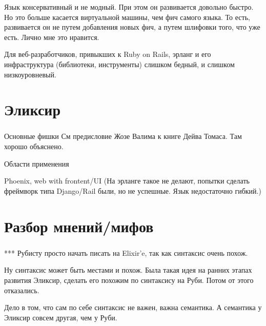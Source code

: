 \documentclass[10pt]{beamer}
\begin{document}
Язык консервативный и не модный. При этом он развивается довольно быстро. Но это больше касается виртуальной машины,
чем фич самого языка. То есть, развивается он не путем добавления новых фич, а путем шлифовки того, что уже есть.
Лично мне это нравится.

Для веб-разработчиков, привыкших к Ruby on Rails, эрланг и его инфраструктура (библиотеки, инструменты)
слишком бедный, и слишком низкоуровневый.


\section{Эликсир}

\begin{frame}
\frametitle{}
\centering
\par \bigskip
\end{frame}

\begin{frame}
\frametitle{}
\centering
\par \bigskip
\end{frame}

Основные фишки
См предисловие Жозе Валима к книге Дейва Томаса. Там хорошо объяснено.

Области применения

Phoenix, web with frontent/UI
(На эрланге такое не делают, попытки сделать фреймворк типа Django/Rail были, но не успешные. Язык недостаточно гибкий.)


\section{Разбор мнений/мифов}

\begin{frame}
\frametitle{}
\centering
\par \bigskip
\end{frame}

\begin{frame}
\frametitle{}
\centering
\par \bigskip
\end{frame}

*** Рубисту просто начать писать на Elixir'e, так как синтаксис очень похож.

Ну синтаксис может быть местами и похож. Была такая идея на ранних этапах развития Эликсир, сделать его похожим по синтаксису на Руби. Потом от этого отказались.

Дело в том, что сам по себе синтаксис не важен, важна семантика. А семантика у Эликсир совсем другая, чем у Руби.
\end{document}
